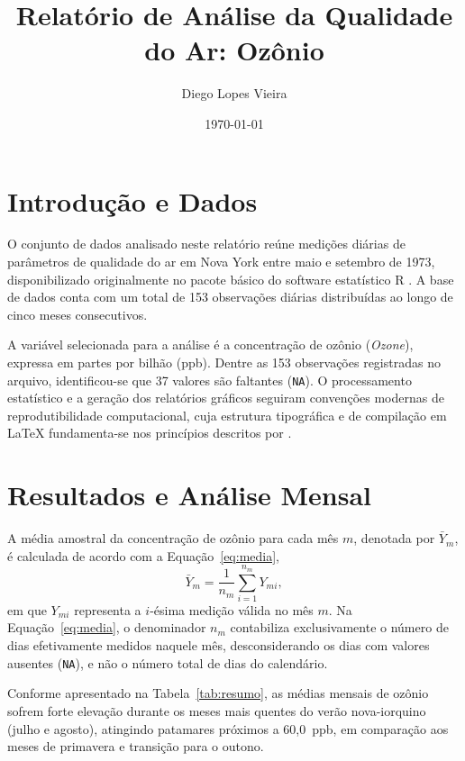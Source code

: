 \documentclass[12pt,a4paper]{article}
\title{Relatório de Análise da Qualidade do Ar: Ozônio}
\author{Diego Lopes Vieira}
\date{\today}
\begin{document}
\maketitle

\section{Introdução e Dados}
\label{sec:introducao}

O conjunto de dados analisado neste relatório reúne medições diárias de parâmetros de qualidade do ar em Nova York entre maio e setembro de 1973, disponibilizado originalmente no pacote básico do software estatístico R \citep{rcore}. A base de dados conta com um total de 153 observações diárias distribuídas ao longo de cinco meses consecutivos.

A variável selecionada para a análise é a concentração de ozônio (\textit{Ozone}), expressa em partes por bilhão (ppb). Dentre as 153 observações registradas no arquivo, identificou-se que 37 valores são faltantes (\texttt{NA}). O processamento estatístico e a geração dos relatórios gráficos seguiram convenções modernas de reprodutibilidade computacional, cuja estrutura tipográfica e de compilação em \LaTeX{} fundamenta-se nos princípios descritos por \citet{lamport1994}.

\section{Resultados e Análise Mensal}
\label{sec:resultados}

A média amostral da concentração de ozônio para cada mês $m$, denotada por $\bar{Y}_m$, é calculada de acordo com a Equação~\eqref{eq:media},
\begin{equation}
  \label{eq:media}
  \bar{Y}_m = \frac{1}{n_m} \sum_{i=1}^{n_m} Y_{mi},
\end{equation}
em que $Y_{mi}$ representa a $i$-ésima medição válida no mês $m$. Na Equação~\eqref{eq:media}, o denominador $n_m$ contabiliza exclusivamente o número de dias efetivamente medidos naquele mês, desconsiderando os dias com valores ausentes (\texttt{NA}), e não o número total de dias do calendário.

Conforme apresentado na Tabela~\ref{tab:resumo}, as médias mensais de ozônio sofrem forte elevação durante os meses mais quentes do verão nova-iorquino (julho e agosto), atingindo patamares próximos a 60,0~ppb, em comparação aos meses de primavera e transição para o outono.
\end{document}
